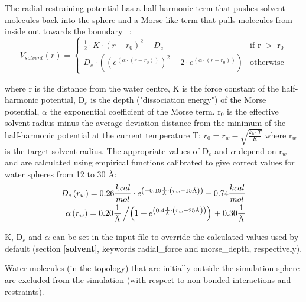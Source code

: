 \documentclass[a4paper,11pt]{article}
\let\origcite\cite
\def\cite#1{\unskip~\origcite{#1}}
\begin{document}
The radial restraining potential has a half-harmonic term that
pushes solvent molecules back into the sphere and a Morse-like
term that pulls molecules from inside out towards the boundary
\cite{Essex1995}:
\begin {equation}
\label{eq:scaas}
 V_{solvent}(r) = \begin{cases}
    \frac{1}{2}\cdot K \cdot \left( r-r_0 \right) ^2 - D_e & \text{if r $>$ r$_0$} \\
    D_e \cdot \left( \left( e^{ \left( \alpha \cdot \left( r-r_0 \right) \right)} \right)
     ^2 - 2\cdot e^{ \left( \alpha \cdot \left( r-r_0 \right) \right)} \right) & \text{otherwise}
  \end{cases}
\end{equation}

where r is the distance from the water centre, K is the force
constant of the half-harmonic potential, D$_e$ is the depth
("dissociation energy") of the Morse potential, $\alpha$ the
exponential coefficient of the Morse term. r$_0$ is the effective
solvent radius minus the average deviation distance from the
minimum of the half-harmonic potential at the current temperature
T:  $r_0 = r_w - \sqrt{\frac{k_b \cdot T}{K}}$ where r$_w$ is the
target solvent radius. The appropriate values of D$_e$ and
$\alpha$ depend on r$_w$ and are calculated using empirical
functions calibrated to give correct values for water spheres from
12 to 30 {\AA}:
\begin {equation}
\label {eq:empscaas}
\begin {split}
D_e \left(r_w \right) = 0.26 \frac{kcal}{mol} \cdot e^{\left(
-0.19 \frac{1}{\text{{\AA}}} \cdot \left( r_w - 15\text{{\AA}} \right)
\right)} + 0.74
\frac{kcal}{mol} \\
\alpha \left(r_w \right) = 0.20 \frac{1}{\text{{\AA}}} \left/ \left(1
+ e^{ \left( 0.4 \frac{1}{\text{{\AA}}} \cdot \left( r_w - 25\text{{\AA}}
\right) \right)} \right) \right. + 0.30 \frac{1}{\text{{\AA}}}
\end{split}
\end{equation}

K, D$_e$ and $\alpha$ can be set in the input file to override the
calculated values used by default (section [\textbf{solvent}],
keywords radial\_force and morse\_depth, respectively).

Water molecules (in the topology) that are initially outside the
simulation sphere are excluded from the simulation (with respect
to non-bonded interactions and restraints).
\end{document}

